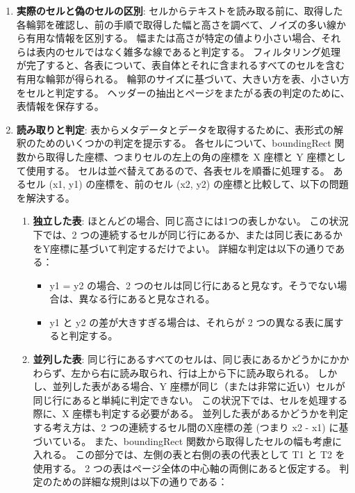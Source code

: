 \documentclass[uplatex, twocolumn,10pt]{jsarticle}
\begin{document}
\begin{enumerate}
    \item \textbf{実際のセルと偽のセルの区別}:
    セルからテキストを読み取る前に、取得した各輪郭を確認し、前の手順で取得した幅と高さを調べて、ノイズの多い線から有用な情報を区別する。
    幅または高さが特定の値より小さい場合、それらは表内のセルではなく雑多な線であると判定する。
    フィルタリング処理が完了すると、各表について、表自体とそれに含まれるすべてのセルを含む有用な輪郭が得られる。
    輪郭のサイズに基づいて、大きい方を表、小さい方をセルと判定する。
    ヘッダーの抽出とページをまたがる表の判定のために、表情報を保存する。
    \item \textbf{読み取りと判定}:
    表からメタデータとデータを取得するために、表形式の解釈のためのいくつかの判定を提示する。
    各セルについて、boundingRect 関数から取得した座標、つまりセルの左上の角の座標を X 座標と Y 座標として使用する。
    セルは並べ替えてあるので、各表セルを順番に処理する。
    あるセル (x1, y1) の座標を、前のセル (x2, y2) の座標と比較して、以下の問題を解決する。
    \begin{enumerate}
        \item \textbf{独立した表}:
        ほとんどの場合、同じ高さには1つの表しかない。
        この状況下では、2 つの連続するセルが同じ行にあるか、または同じ表にあるかをY座標に基づいて判定するだけでよい。
        詳細な判定は以下の通りである：
        \begin{itemize}
            \item y1 = y2 の場合、2 つのセルは同じ行にあると見なす。そうでない場合は、異なる行にあると見なされる。
            \item y1 と y2 の差が大きすぎる場合は、それらが 2 つの異なる表に属すると判定する。
        \end{itemize}
        \item \textbf{並列した表}:
        同じ行にあるすべてのセルは、同じ表にあるかどうかにかかわらず、左から右に読み取られ、行は上から下に読み取られる。
        しかし、並列した表がある場合、Y 座標が同じ（または非常に近い）セルが同じ行にあると単純に判定できない。
        この状況下では、セルを処理する際に、X 座標も判定する必要がある。
        並列した表があるかどうかを判定する考え方は、2 つの連続するセル間のX座標の差 (つまり x2 - x1) に基づいている。
        また、boundingRect 関数から取得したセルの幅も考慮に入れる。
        この部分では、左側の表と右側の表の代表として T1 と T2 を使用する。
        2 つの表はページ全体の中心軸の両側にあると仮定する。
        判定のための詳細な規則は以下の通りである：
        \begin{itemize}

\end{itemize}
\end{enumerate}
\end{enumerate}
\end{document}
